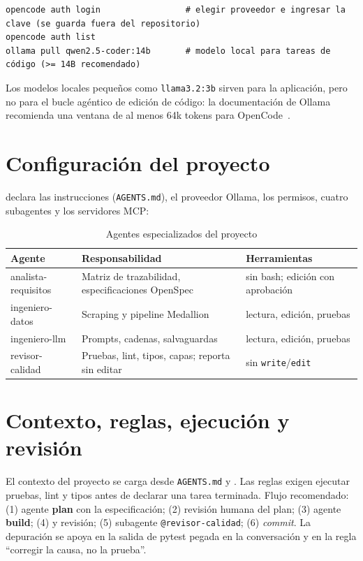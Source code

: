 \begin{lstlisting}[style=ps]
opencode auth login                 # elegir proveedor e ingresar la clave (se guarda fuera del repositorio)
opencode auth list
ollama pull qwen2.5-coder:14b       # modelo local para tareas de código (>= 14B recomendado)
\end{lstlisting}
Los modelos locales pequeños como \texttt{llama3.2:3b} sirven para la aplicación, pero no para el bucle
agéntico de edición de código: la documentación de Ollama recomienda una ventana de al menos 64k tokens para
OpenCode~\cite{ollama-opencode}.

\section{Configuración del proyecto}
 declara las instrucciones (\texttt{AGENTS.md}), el proveedor Ollama, los permisos, cuatro
subagentes y los servidores MCP:

\begin{table}[H]\centering\small
\caption{Agentes especializados del proyecto}\label{tab:agentes}
\begin{tabularx}{\linewidth}{@{}l X l@{}}\toprule
Agente & Responsabilidad & Herramientas\\\midrule
analista-requisitos & Matriz de trazabilidad, especificaciones OpenSpec & sin bash; edición con aprobación\\
ingeniero-datos & Scraping y pipeline Medallion & lectura, edición, pruebas\\
ingeniero-llm & Prompts, cadenas, salvaguardas & lectura, edición, pruebas\\
revisor-calidad & Pruebas, lint, tipos, capas; reporta sin editar & sin \texttt{write}/\texttt{edit}\\\bottomrule
\end{tabularx}
\end{table}

\section{Contexto, reglas, ejecución y revisión}
El contexto del proyecto se carga desde \texttt{AGENTS.md} y . Las reglas exigen
ejecutar pruebas, lint y tipos antes de declarar una tarea terminada. Flujo recomendado: (1) agente
\textbf{plan} con la especificación; (2) revisión humana del plan; (3) agente \textbf{build}; (4)
 y revisión; (5) subagente \texttt{@revisor-calidad}; (6) \emph{commit}. La depuración se apoya
en la salida de pytest pegada en la conversación y en la regla ``corregir la causa, no la prueba''.

